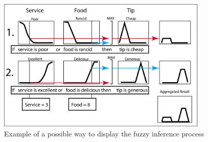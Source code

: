\begin{figure}[ht!]
	\begin{center}
		\includegraphics[width=0.9\textwidth]{images/inference}
	\end{center}
	\vspace{-2mm}
	\caption{Example of a possible way to display the fuzzy inference process}
	\label{fig:fw-inf}
	\vspace{-1mm}
\end{figure}

